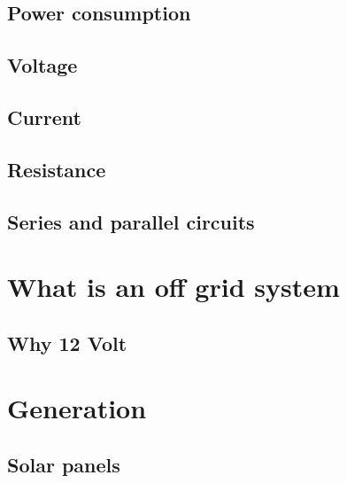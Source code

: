 \documentclass[letterpaper,10pt,english]{sphinxmanual}
\begin{document}
\section{Power consumption}
\label{\detokenize{basic_concepts:power-consumption}}

\section{Voltage}
\label{\detokenize{basic_concepts:voltage}}

\section{Current}
\label{\detokenize{basic_concepts:current}}

\section{Resistance}
\label{\detokenize{basic_concepts:resistance}}

\section{Series and parallel circuits}
\label{\detokenize{basic_concepts:series-and-parallel-circuits}}

\chapter{What is an off grid system}
\label{\detokenize{what_is_an_off_grid_system:what-is-an-off-grid-system}}\label{\detokenize{what_is_an_off_grid_system::doc}}

\section{Why 12 Volt}
\label{\detokenize{what_is_an_off_grid_system:why-12-volt}}

\chapter{Generation}
\label{\detokenize{generation:generation}}\label{\detokenize{generation::doc}}

\section{Solar panels}
\label{\detokenize{generation:solar-panels}}
\end{document}
